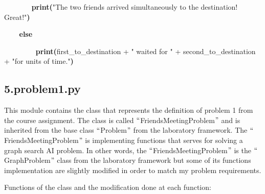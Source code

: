\documentclass[12pt]{article}
\begin{document}
\begin{justify}
{\fontsize{8pt}{9.6pt}\selectfont \textbf{\ \ \ \ \ \   \tabto{0.75in}  \tab \tab print(}"The two friends arrived simultaneously to the destination! \tab \tab \tab \tab \tab Great!"\textbf{)}\par}
\end{justify}\par

\begin{justify}
{\fontsize{8pt}{9.6pt}\selectfont \textbf{\ \ \   \tabto{0.75in} \tab else}\par}
\end{justify}\par

\begin{justify}
{\fontsize{8pt}{9.6pt}\selectfont \textbf{\ \ \ \ \ \ \   \tabto{0.75in} \tab \tab print(}first\_to\_destination + " waited for " + second\_to\_destination + "for \tab \tab \tab \tab [" + difference + "] units of time."\textbf{)}\par}
\end{justify}\par


\vspace{\baselineskip}
\subsection*{5.\hspace*{10pt}problem1.py}
\begin{adjustwidth}{0.5in}{0.0in}
\begin{justify}
This module contains the class that represents the definition of problem 1 from the course assignment. The class is called $``$FriendsMeetingProblem$"$  and is inherited from the base class $``$Problem$"$  from the laboratory framework. The $``$FriendsMeetingProblem$"$  is implementing functions that serves for solving a graph search AI problem. In other words, the $``$FriendsMeetingProblem$"$  is the $``$GraphProblem$"$  class from the laboratory framework but some of its functions implementation are slightly modified in order to match my problem requirements. 
\end{justify}\par

\end{adjustwidth}

\begin{adjustwidth}{0.5in}{0.0in}
\begin{justify}
Functions of the class and the modification done at each function:
\end{justify}\par

\end{adjustwidth}
\end{document}
